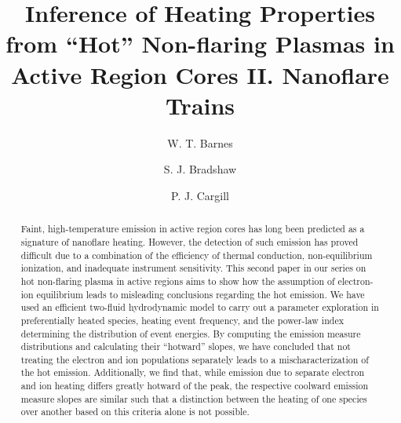 \documentclass[apj]{emulateapj}
\begin{document}
	\title{Inference of Heating Properties from ``Hot'' Non-flaring Plasmas in Active Region Cores II. Nanoflare Trains}
	\author{W. T. Barnes}
	\author{S. J. Bradshaw}
	\author{P. J. Cargill}
	\begin{abstract}
		Faint, high-temperature emission in active region cores has long been predicted as a signature of nanoflare heating. However, the detection of such emission has proved difficult due to a combination of the efficiency of thermal conduction, non-equilibrium ionization, and inadequate instrument sensitivity. This second paper in our series on hot non-flaring plasma in active regions aims to show how the assumption of electron-ion equilibrium leads to misleading conclusions regarding the hot emission. We have used an efficient two-fluid hydrodynamic model to carry out a parameter exploration in preferentially heated species, heating event frequency, and the power-law index determining the distribution of event energies. By computing the emission measure distributions and calculating their ``hotward'' slopes, we have concluded that not treating the electron and ion populations separately leads to a mischaracterization of the hot emission. Additionally, we find that, while emission due to separate electron and ion heating differs greatly hotward of the peak, the respective coolward emission measure slopes are similar such that a distinction between the heating of one species over another based on this criteria alone is not possible. 
	\end{abstract}
\end{document}
